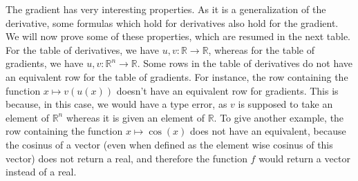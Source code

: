 \documentclass{article}
\theoremstyle{definition}
\theoremstyle{remark}
\theoremstyle{example}
\begin{document}
The gradient has very interesting properties. As it is a generalization of the derivative, some formulas which hold for derivatives also hold for the gradient. We will now prove some of these properties, which are resumed in the next table. For the table of derivatives, we have $u, v : \mathbb{R} \rightarrow \mathbb{R}$, whereas for the table of gradients, we have $u, v : \mathbb{R}^n \rightarrow \mathbb{R}$. Some rows in the table of derivatives do not have an equivalent row for the table of gradients. For instance, the row containing the function $x \mapsto v(u(x))$ doesn't have an equivalent row for gradients. This is because, in this case, we would have a type error, as $v$ is supposed to take an element of $\mathbb{R}^n$ whereas it is given an element of $\mathbb{R}$. To give another example, the row containing the function $x \mapsto \cos(x)$ does not have an equivalent, because the cosinus of a vector (even when defined as the element wise cosinus of this vector) does not return a real, and therefore the function $f$ would return a vector instead of a real.
\end{document}
